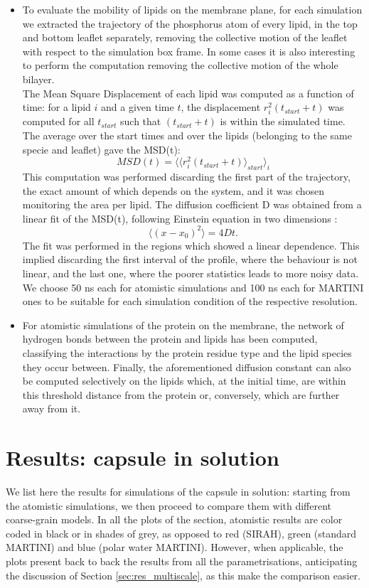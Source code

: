 \begin{itemize}
\item To evaluate the mobility of lipids on the membrane plane, for each simulation we extracted the trajectory of the phosphorus atom of every lipid, in the top and bottom leaflet separately, removing the collective motion of the leaflet with respect to the simulation box frame. In some cases it is also interesting to perform the computation removing the collective motion of the whole bilayer. \\ The Mean Square Displacement of each lipid was computed as a function of time: for a lipid $i$ and a given time $t$, the displacement $r_i^2(t_{start}+t)$ was computed for all $t_{start}$ such that $(t_{start}+t)$ is within the simulated time. The average over the start times and over the lipids (belonging to the same specie and leaflet) gave the MSD(t):
\begin{equation}
MSD(t) = \langle \langle r_i^2(t_{start}+t) \rangle_{start} \rangle_i
\end{equation}
This computation was performed discarding the first part of the trajectory, the exact amount of which depends on the system, and it was chosen monitoring the area per lipid.
The diffusion coefficient D was obtained from a linear fit of the MSD(t), following Einstein equation in two dimensions \citep{Einstein1956}:
\begin{equation}
\langle \left( x - x_0 \right)^2 \rangle = 4Dt.
\end{equation}
The fit was performed in the regions which showed a linear dependence. This implied discarding the first interval of the profile, where the behaviour is not linear, and the last one, where the poorer statistics leads to more noisy data. We choose 50 ns each for atomistic simulations and 100 ns each for MARTINI ones to be suitable for each simulation condition of the respective resolution. 

\item For atomistic simulations of the protein on the membrane, the network of hydrogen bonds between the protein and lipids has been computed, classifying the interactions by the protein residue type and the lipid species they occur between.
%
Finally, the aforementioned diffusion constant can also be computed selectively on the lipids which, at the initial time, are within this threshold distance from the protein or, conversely, which are further away from it.
\end{itemize}

\section{Results: capsule in solution} \label{sec:results_cap}
We list here the results for simulations of the capsule in solution: starting from the atomistic simulations, we then proceed to compare them with different coarse-grain models. In all the plots of the section, atomistic results are color coded in black or in shades of grey, as opposed to red (SIRAH), green (standard MARTINI) and blue (polar water MARTINI). However, when applicable, the plots present back to back the results from all the parametrisations, anticipating the discussion of Section \ref{sec:res_multiscale}, as this make the comparison easier.

